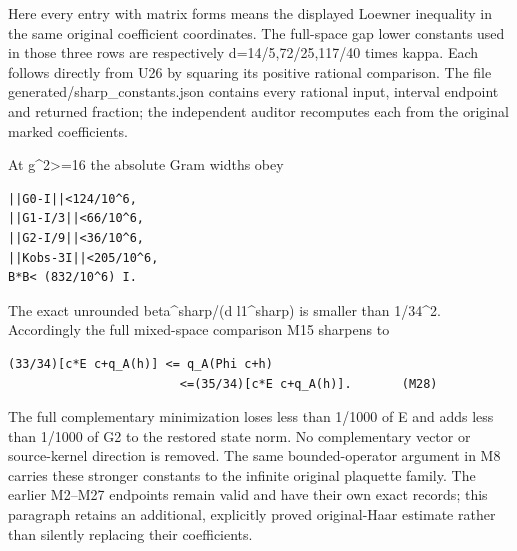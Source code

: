 \documentclass[11pt,a4paper]{article}
\renewcommand{\[}{\begingroup\small\originaldisplaystart}
\renewcommand{\]}{\originaldisplayend\endgroup}
\begin{document}
Here every entry with matrix forms means the displayed Loewner
inequality in the same original coefficient coordinates. The full-space
gap lower constants used in those three rows are respectively
{d\allowbreak{}=\allowbreak{}1\allowbreak{}4\allowbreak{}/\allowbreak{}5\allowbreak{},\allowbreak{}7\allowbreak{}2\allowbreak{}/\allowbreak{}2\allowbreak{}5\allowbreak{},\allowbreak{}1\allowbreak{}1\allowbreak{}7\allowbreak{}/\allowbreak{}4\allowbreak{}0\allowbreak{}}
times kappa. Each follows directly from U26 by squaring its positive
rational comparison. The file
{g\allowbreak{}e\allowbreak{}n\allowbreak{}e\allowbreak{}r\allowbreak{}a\allowbreak{}t\allowbreak{}e\allowbreak{}d\allowbreak{}/\allowbreak{}s\allowbreak{}h\allowbreak{}a\allowbreak{}r\allowbreak{}p\allowbreak{}\_\allowbreak{}c\allowbreak{}o\allowbreak{}n\allowbreak{}s\allowbreak{}t\allowbreak{}a\allowbreak{}n\allowbreak{}t\allowbreak{}s\allowbreak{}.\allowbreak{}j\allowbreak{}s\allowbreak{}o\allowbreak{}n\allowbreak{}}
contains every rational input, interval endpoint and returned fraction;
the independent auditor recomputes each from the original marked
coefficients.

At g\^{}2\textgreater=16 the absolute Gram widths obey

\begin{verbatim}
||G0-I||<124/10^6,
||G1-I/3||<66/10^6,
||G2-I/9||<36/10^6,
||Kobs-3I||<205/10^6,
B*B< (832/10^6) I.
\end{verbatim}

The exact unrounded beta\^{}sharp/(d l1\^{}sharp) is smaller than
1/34\^{}2. Accordingly the full mixed-space comparison M15 sharpens to

\begin{verbatim}
(33/34)[c*E c+q_A(h)] <= q_A(Phi c+h)
                        <=(35/34)[c*E c+q_A(h)].       (M28)
\end{verbatim}

The full complementary minimization loses less than 1/1000 of E and adds
less than 1/1000 of G2 to the restored state norm. No complementary
vector or source-kernel direction is removed. The same bounded-operator
argument in M8 carries these stronger constants to the infinite original
plaquette family. The earlier M2--M27 endpoints remain valid and have
their own exact records; this paragraph retains an additional,
explicitly proved original-Haar estimate rather than silently replacing
their coefficients.
\end{document}
